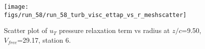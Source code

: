 \begin{figure}[H]
\centering
\texttt{[image: figs/run\_58/run\_58\_turb\_visc\_ettap\_vs\_r\_meshscatter]}
\caption{Scatter plot of $
u_T$ pressure relaxation term vs radius at $z/c$=9.50, $V_{free}$=29.17, station 6.}
\end{figure}


